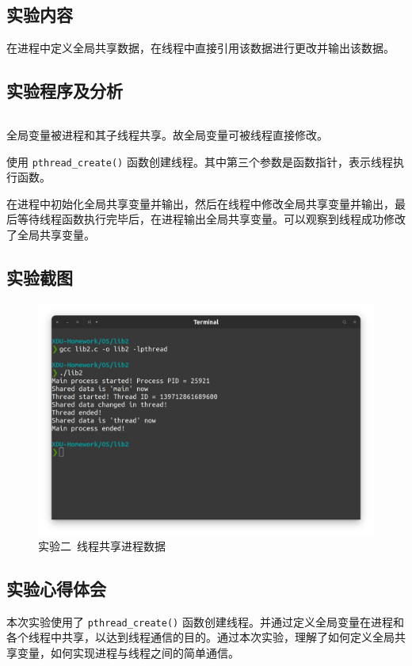\documentclass{article}
\begin{document}
		\subsection{实验内容}
			在进程中定义全局共享数据，在线程中直接引用该数据进行更改并输出该数据。

		\subsection{实验程序及分析}
			\inputminted[linenos,breaklines,tabsize=4]{c}{lib2/lib2.c}

			全局变量被进程和其子线程共享。故全局变量可被线程直接修改。

			使用 \texttt{pthread_create()} 函数创建线程。其中第三个参数是函数指针，表示线程执行函数。

			在进程中初始化全局共享变量并输出，然后在线程中修改全局共享变量并输出，最后等待线程函数执行完毕后，在进程输出全局共享变量。可以观察到线程成功修改了全局共享变量。

		\subsection{实验截图}
			\begin{figure}[htbp]
				\centering
				\includegraphics[width=\textwidth]{lib2/Screenshot.png}
				\caption{实验二\ 线程共享进程数据}
			\end{figure}

		\subsection{实验心得体会}
			本次实验使用了 \texttt{pthread_create()} 函数创建线程。并通过定义全局变量在进程和各个线程中共享，以达到线程通信的目的。通过本次实验，理解了如何定义全局共享变量，如何实现进程与线程之间的简单通信。
\end{document}
